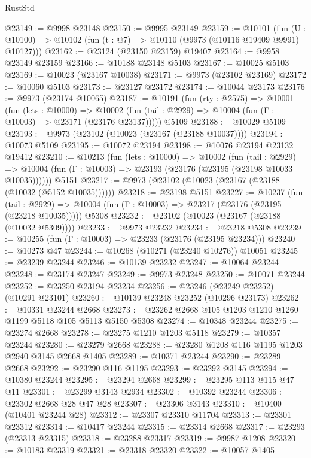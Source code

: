 \begin{lexlean}{RustStd}
\begin{coremodule}
@23149 := @9998 @23148
@23150 := @9995 @23149
@23159 := @10101
    (fun (U : @10100) => @10102 (fun (t : @7) => @10110 (@9973 (@10116 @19409 @9991) @10127)))
@23162 := @23124 (@23150 @23159) @19407
@23164 := @9958 @23149 @23159
@23166 := @10188 @23148 @5103
@23167 := @10025 @5103
@23169 := @10023 (@23167 @10038)
@23171 := @9973 (@23102 @23169)
@23172 := @10060 @5103
@23173 := @23127 @23172
@23174 := @10044 @23173
@23176 := @9973 (@23174 @10065)
@23187 := @10191
    (fun (rty : @2575) =>
    @10001
      (fun (lets : @10000) =>
      @10002 (fun (tail : @2929) => @10004 (fun (Γ : @10003) => @23171 (@23176 @23137)))))
    @5109
@23188 := @10029 @5109
@23193 := @9973 (@23102 (@10023 (@23167 (@23188 @10037))))
@23194 := @10073 @5109
@23195 := @10072 @23194
@23198 := @10076 @23194 @23132 @19412
@23210 := @10213
    (fun (lets : @10000) =>
    @10002
      (fun (tail : @2929) =>
      @10004 (fun (Γ : @10003) => @23193 (@23176 (@23195 (@23198 @10033 @10035))))))
    @5151
@23217 := @9973 (@23102 (@10023 (@23167 (@23188 (@10032 (@5152 @10035))))))
@23218 := @23198 @5151
@23227 := @10237
    (fun (tail : @2929) => @10004 (fun (Γ : @10003) => @23217 (@23176 (@23195 (@23218 @10035)))))
    @5308
@23232 := @23102 (@10023 (@23167 (@23188 (@10032 @5309))))
@23233 := @9973 @23232
@23234 := @23218 @5308
@23239 := @10255 (fun (Γ : @10003) => @23233 (@23176 (@23195 @23234)))
@23240 := @10273 @47
@23244 := @10268 (@10271 (@23240 @10276)) @10051
@23245 := @23239 @23244
@23246 := @10139 @23232
@23247 := @10064 @23244
@23248 := @23174 @23247
@23249 := @9973 @23248
@23250 := @10071 @23244
@23252 := @23250 @23194 @23234
@23256 := @23246 (@23249 @23252) (@10291 @23101)
@23260 := @10139 @23248 @23252 (@10296 @23173)
@23262 := @10331 @23244 @2668
@23273 := @23262 @2668 @105 @1203 @1210 @1260 @1199 @5118 @105 @5113 @5150 @5308
@23274 := @10348 @23244
@23275 := @23274 @2668
@23278 := @23275 @1210 @1203 @5118
@23279 := @10357 @23244
@23280 := @23279 @2668
@23288 := @23280 @1208 @116 @1195 @1203 @2940 @3145 @2668 @1405
@23289 := @10371 @23244
@23290 := @23289 @2668
@23292 := @23290 @116 @1195
@23293 := @23292 @3145
@23294 := @10380 @23244
@23295 := @23294 @2668
@23299 := @23295 @113 @115 @47 @11
@23301 := @23299 @3143 @2934
@23302 := @10392 @23244
@23306 := @23302 @2668 @28 @47 @28
@23307 := @23306 @3143
@23310 := @10400 (@10401 @23244 @28)
@23312 := @23307 @23310 @11704
@23313 := @23301 @23312
@23314 := @10417 @23244
@23315 := @23314 @2668
@23317 := @23293 (@23313 @23315)
@23318 := @23288 @23317
@23319 := @9987 @1208
@23320 := @10183 @23319
@23321 := @23318 @23320
@23322 := @10057 @1405

\end{coremodule}
\end{lexlean}
